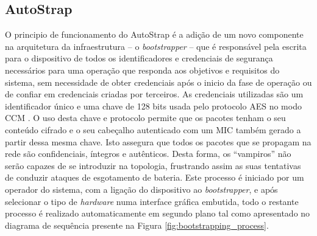\documentclass{llncs}
\begin{document}
%

\subsection{AutoStrap}
\label{sec:implementation_details}
O principio de funcionamento do AutoStrap é a adição de um novo componente na arquitetura da infraestrutura -- o \textit{bootstrapper} -- que é responsável pela escrita para o dispositivo de todos os identificadores e credenciais de segurança necessários para uma operação que responda aos objetivos e requisitos do sistema, sem necessidade de obter credenciais após o inicio da fase de operação ou de confiar em credenciais criadas por terceiros. 
As credenciais utilizadas são um identificador único e uma chave de 128 bits usada pelo protocolo \ac{AES} \cite{Fips2001} no modo \ac{CCM} %
\cite{Corp2005}. 
O uso desta chave e protocolo permite que os pacotes tenham o seu conteúdo cifrado e o seu cabeçalho autenticado com um \ac{MIC} também gerado a partir dessa mesma chave. Isto assegura que todos os pacotes que se propagam na rede são confidenciais, íntegros e autênticos. 
Desta forma, os ``vampiros'' não serão capazes de se introduzir na topologia, frustrando assim as suas tentativas de conduzir ataques de esgotamento de bateria. 
Este processo é iniciado por um operador do sistema, com a ligação do dispositivo ao \textit{bootstrapper}, e após selecionar o tipo de \textit{hardware} numa interface gráfica embutida, todo o restante processo é realizado automaticamente em segundo plano tal como apresentado no diagrama de sequência presente na Figura \ref{fig:bootstrapping_process}.
\end{document}

